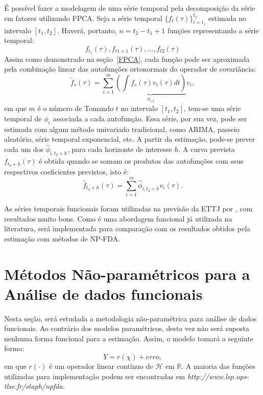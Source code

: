 \documentclass[
	12pt,				%
	openright,			%
	oneside,			%
	a4paper,			%
	english,			%
	brazil				%
	]{dissertacao-ufrgs-abntex2}
\begin{document}
É possível fazer a modelagem de uma série temporal pela decomposição da série em fatores utilizando FPCA. Seja a série temporal $\{ f_t(\tau) \}_{t=t_1}^{t_2}$ estimada no  intervalo $[t_1,t_2]$. Haverá, portanto, $n=t_2-t_1+1$ funções representando a série temporal:
\begin{equation}
f_{t_1}(\tau), f_{t1+1}(\tau), \dots, f_{t2}(\tau)
\end{equation}
Assim como demonstrado na seção~\ref{FPCA}, cada função pode ser aproximada pela combinação linear das autofunções ortonormais do operador de covariância:
\begin{equation}
\widetilde{f}_s(\tau)=\sum_{i=1}^{m}{ \underbrace{ \left(  \int f_s(\tau)  v_i(\tau)dt \right) }_{\phi_{i,t}} } v_i,
\end{equation}
em que $m$ é o número de 
Tomando $t$ no intervalo $[t_1,t_2]$, tem-se uma série temporal de $\phi_i$ associada a cada autofunção. Essa série, por sua vez, pode ser estimada com algum método univariado tradicional, como ARIMA, passeio aleatório, série temporal exponencial, etc. A partir da estimação, pode-se prever cada um dos $\hat{\phi}_{i,t_2+h}$, para cada horizonte de interesse $h$. A curva prevista $f_{t_2+h}(\tau)$ é obtida quando se somam os produtos das autofunções com seus respectivos coeficientes previstos, isto é:
\begin{equation}
\hat{f}_{t_2+h}(\tau)= \sum_{i=1}^{m}{\hat{\phi}_{i,t_2+h} v_i(\tau) }.
\end{equation}

As séries temporais funcionais foram utilizadas na previsão da ETTJ por , com resultados muito bons. Como é uma abordagem funcional já utilizada na literatura, será implementada para comparação com os resultados obtidos pela estimação com métodos de NP-FDA.

\section{Métodos Não-paramétricos para a Análise de dados funcionais}

Nesta seção, será estudada a metodologia não-paramétrica para análise
de dados funcionais. Ao contrário dos modelos paramétricos, desta
vez não será suposta nenhuma forma funcional para a estimação. Assim,
o modelo tomará a seguinte forma:
\[
Y=r(\chi)+erro,
\]
em que $r(\cdot)$ é um operador linear contínuo de $\mathcal{H}$
em $\mathbb{R}$. A maioria das funções utilizadas para implementação
podem ser encontradas em \emph{http://www.lsp.ups-tlse.fr/staph/npfda. }
\end{document}
